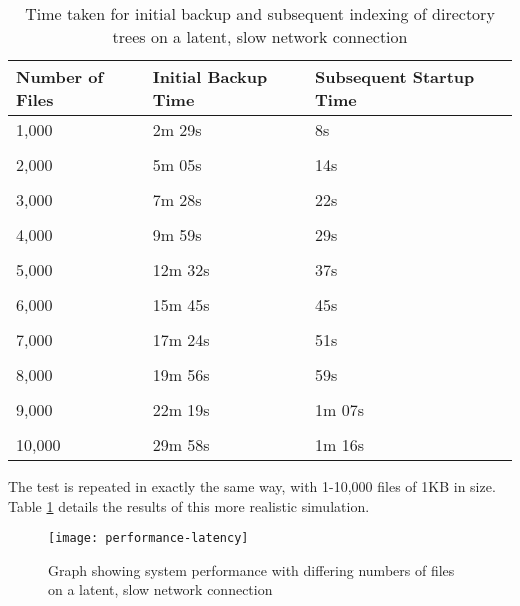 \begin{table}
    \centering
    \begin{tabular}{ l l l }
        Number of Files & Initial Backup Time   & Subsequent Startup Time
        \\ \toprule
        1,000           & 2m 29s                & 8s
        \\ \\
        2,000           & 5m 05s                & 14s
        \\ \\
        3,000           & 7m 28s                & 22s
        \\ \\
        4,000           & 9m 59s                & 29s
        \\ \\
        5,000           & 12m 32s               & 37s
        \\ \\
        6,000           & 15m 45s               & 45s
        \\ \\
        7,000           & 17m 24s               & 51s
        \\ \\
        8,000           & 19m 56s               & 59s
        \\ \\
        9,000           & 22m 19s               & 1m 07s
        \\ \\
        10,000          & 29m 58s               & 1m 16s
        \\ \bottomrule
    \end{tabular}
    \caption{Time taken for initial backup and subsequent indexing of directory
    trees on a latent, slow network connection}
    \label{tab:performance-latency}
\end{table}

The test is repeated in exactly the same way, with 1-10,000 files of 1KB in
size. Table \ref{tab:performance-latency} details the results of this more
realistic simulation.

\begin{figure}
    \begin{center}
        \texttt{[image: performance-latency]}
    \end{center}
    \caption{Graph showing system performance with differing numbers of files
    on a latent, slow network connection}
    \label{fig:performance-graph-latency}
\end{figure}

